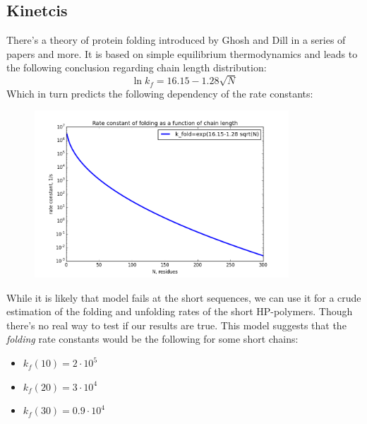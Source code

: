 \documentclass[12pt]{paper}
\begin{document}
\subsection{Kinetcis}
There's a theory of protein folding introduced by Ghosh and Dill in a series of papers 
\cite{Ghosh2010,Dill2011} and more. It is based on simple equilibrium thermodynamics and leads to 
the following conclusion regarding chain length distribution:
  \begin{equation}\label{eq:lnk}
   \ln k_f=16.15-1.28 \sqrt{N}
  \end{equation} 
Which in turn predicts the following dependency of the rate constants:
\begin{figure}[h!]
  \centering
  \includegraphics[width=0.85\textwidth]{pictures/k_fold_N.png} 
  \caption{}
  \label{fig:k_fold_N}
\end{figure}
While it is likely that model fails at the short sequences, we can use it for a crude estimation 
of the folding and unfolding rates of the short HP-polymers. Though there's no real way to test if 
our results are true.
This model suggests that the \textit{folding} rate constants would be the following for some short 
chains:
  \begin{itemize}
   \item $k_f(10)=2\cdot 10^5$
   \item $k_f(20)=3\cdot 10^4$
   \item $k_f(30)=0.9\cdot 10^4$
  \end{itemize}
\end{document}
